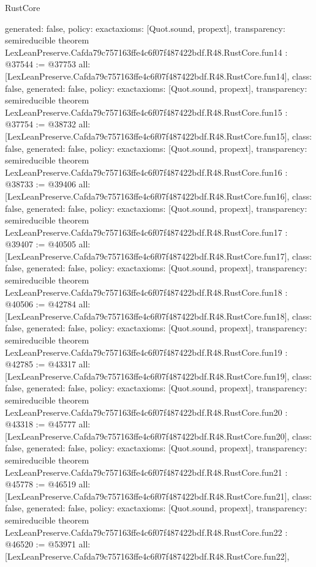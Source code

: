 \begin{lexlean}{RustCore}
\begin{coremodule}
{  generated: false,
  policy: exact{axioms: [Quot.sound, propext]},
  transparency: semireducible
}
theorem LexLeanPreserve.Cafda79c757163ffe4c6f07f487422bdf.R48.RustCore.fun14 : @37544 := @37753 {
  all: [LexLeanPreserve.Cafda79c757163ffe4c6f07f487422bdf.R48.RustCore.fun14],
  class: false,
  generated: false,
  policy: exact{axioms: [Quot.sound, propext]},
  transparency: semireducible
}
theorem LexLeanPreserve.Cafda79c757163ffe4c6f07f487422bdf.R48.RustCore.fun15 : @37754 := @38732 {
  all: [LexLeanPreserve.Cafda79c757163ffe4c6f07f487422bdf.R48.RustCore.fun15],
  class: false,
  generated: false,
  policy: exact{axioms: [Quot.sound, propext]},
  transparency: semireducible
}
theorem LexLeanPreserve.Cafda79c757163ffe4c6f07f487422bdf.R48.RustCore.fun16 : @38733 := @39406 {
  all: [LexLeanPreserve.Cafda79c757163ffe4c6f07f487422bdf.R48.RustCore.fun16],
  class: false,
  generated: false,
  policy: exact{axioms: [Quot.sound, propext]},
  transparency: semireducible
}
theorem LexLeanPreserve.Cafda79c757163ffe4c6f07f487422bdf.R48.RustCore.fun17 : @39407 := @40505 {
  all: [LexLeanPreserve.Cafda79c757163ffe4c6f07f487422bdf.R48.RustCore.fun17],
  class: false,
  generated: false,
  policy: exact{axioms: [Quot.sound, propext]},
  transparency: semireducible
}
theorem LexLeanPreserve.Cafda79c757163ffe4c6f07f487422bdf.R48.RustCore.fun18 : @40506 := @42784 {
  all: [LexLeanPreserve.Cafda79c757163ffe4c6f07f487422bdf.R48.RustCore.fun18],
  class: false,
  generated: false,
  policy: exact{axioms: [Quot.sound, propext]},
  transparency: semireducible
}
theorem LexLeanPreserve.Cafda79c757163ffe4c6f07f487422bdf.R48.RustCore.fun19 : @42785 := @43317 {
  all: [LexLeanPreserve.Cafda79c757163ffe4c6f07f487422bdf.R48.RustCore.fun19],
  class: false,
  generated: false,
  policy: exact{axioms: [Quot.sound, propext]},
  transparency: semireducible
}
theorem LexLeanPreserve.Cafda79c757163ffe4c6f07f487422bdf.R48.RustCore.fun20 : @43318 := @45777 {
  all: [LexLeanPreserve.Cafda79c757163ffe4c6f07f487422bdf.R48.RustCore.fun20],
  class: false,
  generated: false,
  policy: exact{axioms: [Quot.sound, propext]},
  transparency: semireducible
}
theorem LexLeanPreserve.Cafda79c757163ffe4c6f07f487422bdf.R48.RustCore.fun21 : @45778 := @46519 {
  all: [LexLeanPreserve.Cafda79c757163ffe4c6f07f487422bdf.R48.RustCore.fun21],
  class: false,
  generated: false,
  policy: exact{axioms: [Quot.sound, propext]},
  transparency: semireducible
}
theorem LexLeanPreserve.Cafda79c757163ffe4c6f07f487422bdf.R48.RustCore.fun22 : @46520 := @53971 {
  all: [LexLeanPreserve.Cafda79c757163ffe4c6f07f487422bdf.R48.RustCore.fun22],
}
\end{coremodule}
\end{lexlean}
